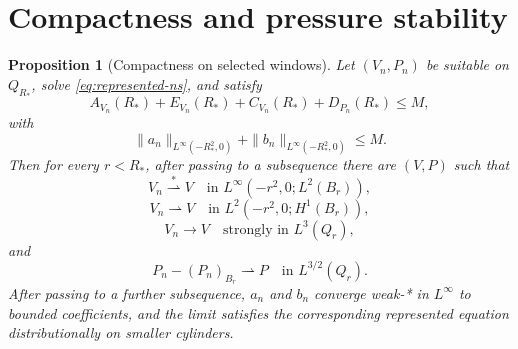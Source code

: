 \documentclass[11pt]{amsart}
\theoremstyle{plain}
\newtheorem{proposition}[theorem]{Proposition}
\theoremstyle{definition}
\theoremstyle{remark}
\begin{document}
\section{Compactness and pressure stability}

\begin{proposition}[Compactness on selected windows]\label{prop:compactness}
Let \((V_n,P_n)\) be suitable on \(Q_{R_*}\), solve \eqref{eq:represented-ns}, and satisfy
\[
  A_{V_n}(R_*)+E_{V_n}(R_*)+C_{V_n}(R_*)+D_{P_n}(R_*)\le M,
\]
with
\[
  \|a_n\|_{L^\infty(-R_*^2,0)}+\|b_n\|_{L^\infty(-R_*^2,0)}\le M.
\]
Then for every \(r<R_*\), after passing to a subsequence there are \((V,P)\)
such that
\[
  V_n\stackrel{*}{\rightharpoonup}V
  \quad\text{in }L^\infty(-r^2,0;L^2(B_r)),
\]
\[
  V_n\rightharpoonup V
  \quad\text{in }L^2(-r^2,0;H^1(B_r)),
\]
\[
  V_n\to V
  \quad\text{strongly in }L^3(Q_r),
\]
and
\[
  P_n-(P_n)_{B_r}\rightharpoonup P
  \quad\text{in }L^{3/2}(Q_r).
\]
After passing to a further subsequence, \(a_n\) and \(b_n\) converge weak-* in
\(L^\infty\) to bounded coefficients, and the limit satisfies the corresponding
represented equation distributionally on smaller cylinders.
\end{proposition}
\end{document}
